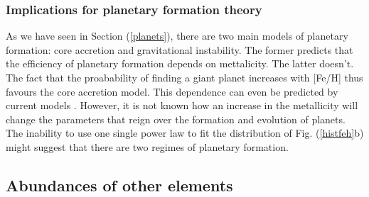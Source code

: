 \documentclass[dvips,12pt,a4paper]{report}
\begin{document}
\subsubsection {Implications for planetary formation theory}

As we have seen in Section (\ref {planets}), there are two main models of planetary formation: core accretion and gravitational instability. The former predicts that the efficiency of planetary formation depends on mettalicity. The latter doesn't. The fact that the proabability of finding a giant planet increases with [Fe/H] thus favours the core accretion model. This dependence can even be predicted by current models \citep{Ida-2004a}. However, it is not known how an increase in the metallicity will change the parameters that reign over the formation and evolution of planets. The inability to use one single power law to fit the distribution of Fig. (\ref{histfeh}b) might suggest that there are two regimes of planetary formation.



\subsection {Abundances of other elements} %
\label {others}
\end{document}

